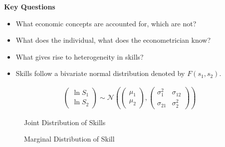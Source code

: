 \begin{frame}
\textbf{Key Questions}\\
\begin{itemize}\setlength\itemsep{1em}
\item What economic concepts are accounted for, which are not?
\item What does the individual, what does the econometrician know?
\item What gives rise to heterogeneity in skills?
\end{itemize}
\end{frame}


\begin{frame}
\begin{itemize}
\item Skills follow a bivariate normal distribution denoted by $F(s_1, s_2)$.
\end{itemize}

\begin{align*}
\begin{pmatrix}
 \ln S_1 \\
 \ln S_2
\end{pmatrix}  \sim \mathcal{N} \left( \begin{pmatrix}
 \mu_1 \\
 \mu_2
\end{pmatrix} , \begin{pmatrix}
 \sigma^2_1  &  \sigma_{12} \\
 \sigma_{21}&  \sigma^2_2
\end{pmatrix} \right)
\end{align*}

\end{frame}

\begin{frame}
\begin{figure}[htp]\centering
\caption{Joint Distribution of Skills}\label{Joint Distribution of Skills}
\end{figure}
\end{frame}

\begin{frame}
\begin{figure}[htp]\centering
\caption{Marginal Distribution of Skill}\label{Marginal Distribution of Skill}
\end{figure}
\end{frame}


